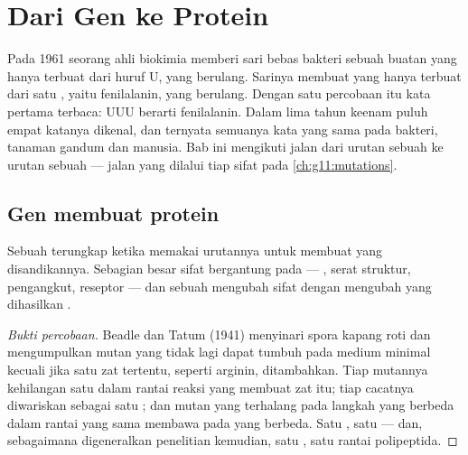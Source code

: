 \chapter{Dari Gen ke Protein}\label{ch:g11:gene-expression}

Pada 1961 seorang ahli biokimia memberi sari bebas  bakteri sebuah
 buatan yang hanya terbuat dari huruf U, yang berulang. Sarinya
membuat  yang hanya terbuat dari satu , yaitu
fenilalanin, yang berulang. Dengan satu percobaan itu kata pertama  terbaca: UUU berarti fenilalanin. Dalam lima tahun keenam
puluh empat katanya dikenal, dan ternyata semuanya kata yang sama pada
bakteri, tanaman gandum dan manusia. Bab ini mengikuti jalan dari
urutan  sebuah  ke urutan  sebuah  ---
jalan yang dilalui tiap sifat pada \cref{ch:g11:mutations}.

\section{Gen membuat protein}

\begin{proposition}\label{prop:g11:gene-expression:onegene}
Sebuah  terungkap ketika  memakai urutannya untuk membuat
 yang disandikannya. Sebagian besar sifat bergantung pada
 --- , serat struktur, pengangkut, reseptor --- dan sebuah
 mengubah sifat dengan mengubah  yang dihasilkan .
\end{proposition}
\begin{proof}[Bukti percobaan]
Beadle dan Tatum (1941) menyinari spora kapang roti dan mengumpulkan
mutan yang tidak lagi dapat tumbuh pada medium minimal kecuali jika
satu zat tertentu, seperti  arginin, ditambahkan. Tiap
mutannya kehilangan satu  dalam rantai reaksi yang membuat zat
itu; tiap cacatnya diwariskan sebagai satu ; dan mutan yang
terhalang pada langkah yang berbeda dalam rantai yang sama membawa
 pada  yang berbeda. Satu , satu  --- dan, sebagaimana
digeneralkan penelitian kemudian, satu , satu rantai polipeptida.
\end{proof}

